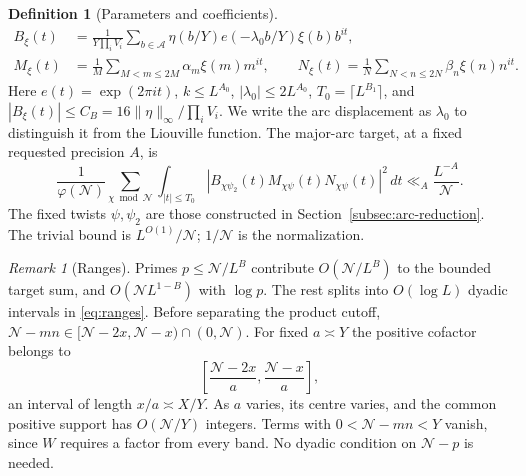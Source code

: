 \documentclass[11pt]{article}
\theoremstyle{definition}
\newtheorem{definition}[theorem]{Definition}
\newcommand{\ph}{\varphi}
\newcommand{\GN}{\mathcal N}
\newcommand{\Aset}{\mathcal A}
\theoremstyle{remark}
\newtheorem{remark}[theorem]{Remark}
\numberwithin{equation}{section}
\begin{document}
\begin{definition}[Parameters and coefficients]
\begin{equation}\label{eq:polynomials}
 \begin{split}
 B_\xi(t)&=\frac1{Y\prod_i V_i}
    \sum_{b\in\Aset}\eta(b/Y)e(-\lambda_0b/Y)\xi(b)b^{it},\\
 M_\xi(t)&=\frac1M\sum_{M<m\le2M}\alpha_m\xi(m)m^{it},\qquad
 N_\xi(t)=\frac1N\sum_{N<n\le2N}\beta_n\xi(n)n^{it}.
 \end{split}
\end{equation}
Here $e(t)=\exp(2\pi it)$, $k\le L^{A_0}$,
$|\lambda_0|\le2L^{A_0}$, $T_0=\lceil L^{B_1}\rceil$, and
$|B_\xi(t)|\le C_B=16\|\eta\|_\infty/\prod_i V_i$.
We write the arc displacement as $\lambda_0$ to distinguish it from
the Liouville function.
The major-arc target, at a fixed requested precision $A$, is
\begin{equation}\tag{$\alpha^*$}\label{eq:alpha-star}
 \frac1{\ph(\GN)}\sum_{\chi\bmod\GN}
 \int_{|t|\le T_0}|B_{\chi\psi_2}(t)M_{\chi\psi}(t)N_{\chi\psi}(t)|^2\,dt
 \ll_A\frac{L^{-A}}{\GN}.
\end{equation}
The fixed twists $\psi,\psi_2$ are those constructed in
Section~\ref{subsec:arc-reduction}. The trivial bound is
$L^{O(1)}/\GN$; $1/\GN$ is the normalization.
\end{definition}

\begin{remark}[Ranges]\label{rem:ranges}
Primes $p\le\GN/L^B$ contribute $O(\GN/L^B)$ to the bounded target
sum, and $O(\GN L^{1-B})$ with $\log p$. The rest splits into
$O(\log L)$ dyadic intervals in \eqref{eq:ranges}.
Before separating the product cutoff,
$\GN-mn\in[\GN-2x,\GN-x)\cap(0,\GN)$.
For fixed $a\asymp Y$ the positive cofactor belongs to
\begin{equation}\label{eq:fixed-cofactor}
 \left[\frac{\GN-2x}{a},\frac{\GN-x}{a}\right],
\end{equation}
an interval of length $x/a\asymp X/Y$. As $a$ varies, its centre
varies, and the common positive support has $O(\GN/Y)$ integers.
Terms with $0<\GN-mn<Y$ vanish, since $W$ requires a factor from
every band. No dyadic condition on $\GN-p$ is needed.
\end{remark}
\end{document}
